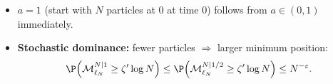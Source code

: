 \begin{itemize}
    \item $a=1$ (start with $N$ particles at $0$ at time $0$) follows from $a\in(0,1)$ immediately.
    \item \textbf{Stochastic dominance:} fewer particles $\Rightarrow$ larger minimum position:
    \[
        \P\!\left(\mathcal M^{N|1}_{\ell_N}\ge\zeta'\log N\right)
        \le
        \P\!\left(\mathcal M^{N|1/2}_{\ell_N}\ge\zeta'\log N\right)
        \le N^{-\varepsilon}.
    \]
\end{itemize}
